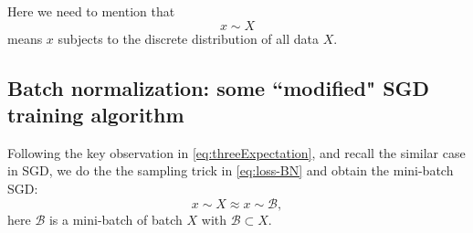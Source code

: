 Here we need to mention that
$$
x \sim X
$$
means $x$ subjects to the discrete distribution of all data $X$. 



\subsection{Batch normalization: some ``modified" SGD training algorithm}
Following the key observation in \eqref{eq:threeExpectation}, and recall the 
similar case in SGD, we do the the sampling trick in \eqref{eq:loss-BN} and
obtain the mini-batch SGD:
\begin{equation}\label{eq:mini-batch-sample}
x \sim X \approx x \sim \mathcal B,
\end{equation}
here $\mathcal B$ is a mini-batch of batch $X$ with $\mathcal B \subset X$.

